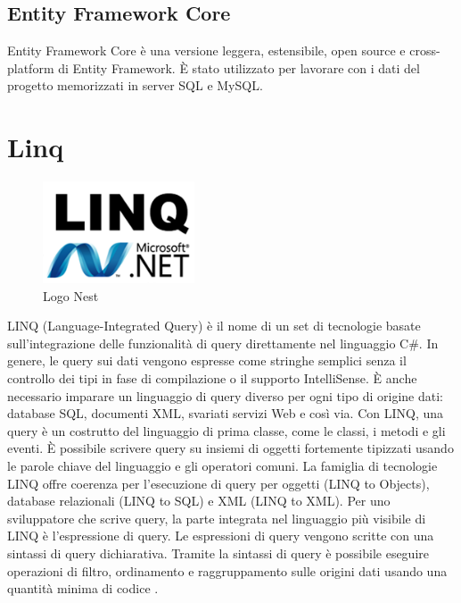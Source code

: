 \subsection{Entity Framework Core}
Entity Framework Core è una versione leggera, estensibile, open source e cross-platform di Entity Framework. È stato utilizzato per lavorare con i dati del progetto memorizzati in server SQL e MySQL.

\pagebreak
\section{Linq}
\label{sec:linq}
\begin{figure}[ht!]
\begin{center}
  \includegraphics[width=4.5cm]{images/linq.png}
  \caption{Logo Nest}
\end{center}
\end{figure}
LINQ (Language-Integrated Query) è il nome di un set di tecnologie basate sull'integrazione delle funzionalità di query direttamente nel linguaggio C\#. In genere, le query sui dati vengono espresse come stringhe semplici senza il controllo dei tipi in fase di compilazione o il supporto IntelliSense. È anche necessario imparare un linguaggio di query diverso per ogni tipo di origine dati: database SQL, documenti XML, svariati servizi Web e così via. Con LINQ, una query è un costrutto del linguaggio di prima classe, come le classi, i metodi e gli eventi. È possibile scrivere query su insiemi di oggetti fortemente tipizzati usando le parole chiave del linguaggio e gli operatori comuni. La famiglia di tecnologie LINQ offre coerenza per l'esecuzione di query per oggetti (LINQ to Objects), database relazionali (LINQ to SQL) e XML (LINQ to XML). Per uno sviluppatore che scrive query, la parte integrata nel linguaggio più visibile di LINQ è l'espressione di query. Le espressioni di query vengono scritte con una sintassi di query dichiarativa. Tramite la sintassi di query è possibile eseguire operazioni di filtro, ordinamento e raggruppamento sulle origini dati usando una quantità minima di codice \cite{Linq}.

